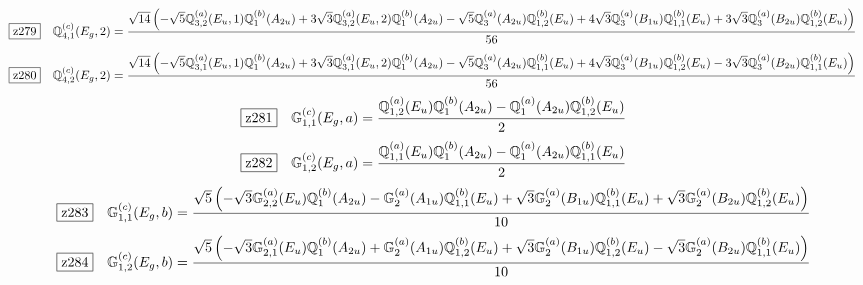 \documentclass[fleqn,10pt,landscape]{jsarticle}
\begin{document}
\begin{dmath*}
\hspace*{3mm}\fbox{z279}\quad \mathbb{Q}_{4,1}^{(c)}(E_{g},2)=\frac{\sqrt{14} \left(- \sqrt{5} \mathbb{Q}_{3,2}^{(a)}(E_{u},1) \mathbb{Q}_{1}^{(b)}(A_{2u}) + 3 \sqrt{3} \mathbb{Q}_{3,2}^{(a)}(E_{u},2) \mathbb{Q}_{1}^{(b)}(A_{2u}) - \sqrt{5} \mathbb{Q}_{3}^{(a)}(A_{2u}) \mathbb{Q}_{1,2}^{(b)}(E_{u}) + 4 \sqrt{3} \mathbb{Q}_{3}^{(a)}(B_{1u}) \mathbb{Q}_{1,1}^{(b)}(E_{u}) + 3 \sqrt{3} \mathbb{Q}_{3}^{(a)}(B_{2u}) \mathbb{Q}_{1,2}^{(b)}(E_{u})\right)}{56}
\end{dmath*}
\begin{dmath*}
\hspace*{3mm}\fbox{z280}\quad \mathbb{Q}_{4,2}^{(c)}(E_{g},2)=\frac{\sqrt{14} \left(- \sqrt{5} \mathbb{Q}_{3,1}^{(a)}(E_{u},1) \mathbb{Q}_{1}^{(b)}(A_{2u}) + 3 \sqrt{3} \mathbb{Q}_{3,1}^{(a)}(E_{u},2) \mathbb{Q}_{1}^{(b)}(A_{2u}) - \sqrt{5} \mathbb{Q}_{3}^{(a)}(A_{2u}) \mathbb{Q}_{1,1}^{(b)}(E_{u}) + 4 \sqrt{3} \mathbb{Q}_{3}^{(a)}(B_{1u}) \mathbb{Q}_{1,2}^{(b)}(E_{u}) - 3 \sqrt{3} \mathbb{Q}_{3}^{(a)}(B_{2u}) \mathbb{Q}_{1,1}^{(b)}(E_{u})\right)}{56}
\end{dmath*}
\begin{dmath*}
\hspace*{3mm}\fbox{z281}\quad \mathbb{G}_{1,1}^{(c)}(E_{g},a)=\frac{\mathbb{Q}_{1,2}^{(a)}(E_{u}) \mathbb{Q}_{1}^{(b)}(A_{2u}) - \mathbb{Q}_{1}^{(a)}(A_{2u}) \mathbb{Q}_{1,2}^{(b)}(E_{u})}{2}
\end{dmath*}
\begin{dmath*}
\hspace*{3mm}\fbox{z282}\quad \mathbb{G}_{1,2}^{(c)}(E_{g},a)=\frac{\mathbb{Q}_{1,1}^{(a)}(E_{u}) \mathbb{Q}_{1}^{(b)}(A_{2u}) - \mathbb{Q}_{1}^{(a)}(A_{2u}) \mathbb{Q}_{1,1}^{(b)}(E_{u})}{2}
\end{dmath*}
\begin{dmath*}
\hspace*{3mm}\fbox{z283}\quad \mathbb{G}_{1,1}^{(c)}(E_{g},b)=\frac{\sqrt{5} \left(- \sqrt{3} \mathbb{G}_{2,2}^{(a)}(E_{u}) \mathbb{Q}_{1}^{(b)}(A_{2u}) - \mathbb{G}_{2}^{(a)}(A_{1u}) \mathbb{Q}_{1,1}^{(b)}(E_{u}) + \sqrt{3} \mathbb{G}_{2}^{(a)}(B_{1u}) \mathbb{Q}_{1,1}^{(b)}(E_{u}) + \sqrt{3} \mathbb{G}_{2}^{(a)}(B_{2u}) \mathbb{Q}_{1,2}^{(b)}(E_{u})\right)}{10}
\end{dmath*}
\begin{dmath*}
\hspace*{3mm}\fbox{z284}\quad \mathbb{G}_{1,2}^{(c)}(E_{g},b)=\frac{\sqrt{5} \left(- \sqrt{3} \mathbb{G}_{2,1}^{(a)}(E_{u}) \mathbb{Q}_{1}^{(b)}(A_{2u}) + \mathbb{G}_{2}^{(a)}(A_{1u}) \mathbb{Q}_{1,2}^{(b)}(E_{u}) + \sqrt{3} \mathbb{G}_{2}^{(a)}(B_{1u}) \mathbb{Q}_{1,2}^{(b)}(E_{u}) - \sqrt{3} \mathbb{G}_{2}^{(a)}(B_{2u}) \mathbb{Q}_{1,1}^{(b)}(E_{u})\right)}{10}
\end{dmath*}
\end{document}
